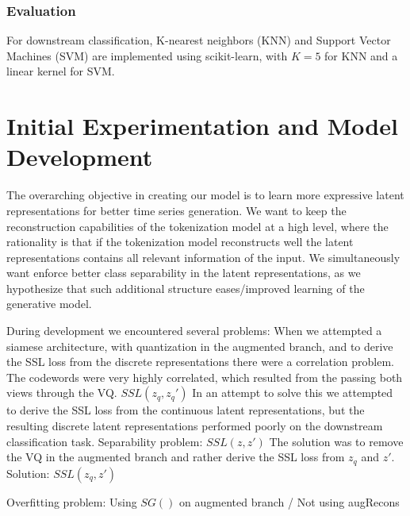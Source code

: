 \documentclass[../../thesis.tex]{subfiles}
\begin{document}
\subsubsection{Evaluation}
For downstream classification, K-nearest neighbors (KNN) and Support Vector Machines (SVM) are implemented using scikit-learn, with $K=5$ for KNN and a linear kernel for SVM. 

\section{Initial Experimentation and Model Development}

The overarching objective in creating our model is to learn more expressive latent representations for better time series generation. We want to keep the reconstruction capabilities of the tokenization model at a high level, where the rationality is that if the tokenization model reconstructs well the latent representations contains all relevant information of the input. We simultaneously want enforce better class separability in the latent representations, as we hypothesize that such additional structure eases/improved learning of the generative model.\newline

During development we encountered several problems:\newline
When we attempted a siamese architecture, with quantization in the augmented branch, and to derive the SSL loss from the discrete representations there were a correlation problem. The codewords were very highly correlated, which resulted from the passing both views through the VQ.  $SSL(z_q,z_q')$ \newline
In an attempt to solve this we attempted to derive the SSL loss from the continuous latent representations, but the resulting discrete latent representations performed poorly on the downstream classification task. Separability problem: $SSL(z,z')$ \newline
The solution was to remove the VQ in the augmented branch and rather derive the SSL loss from $z_q$ and $z'$. Solution: $SSL(z_q,z')$ \newline

Overfitting problem: Using $SG()$ on augmented branch / Not using augRecons \newline
\end{document}

